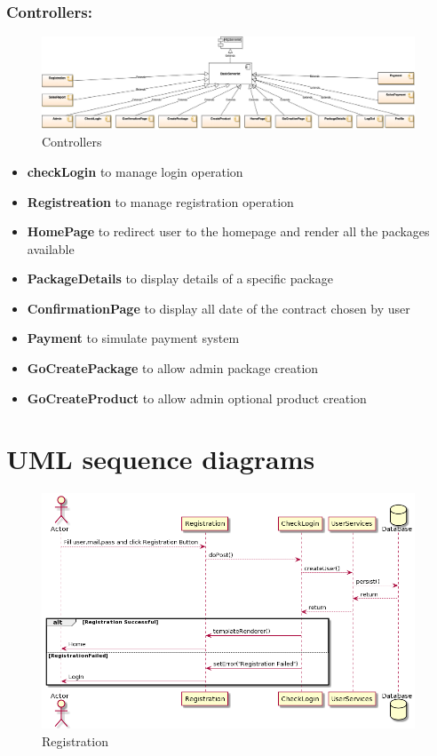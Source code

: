 \documentclass{article}
\begin{document}
\subsubsection{Controllers:}
\begin{figure}[hbt!]
\centering
\includegraphics[width=0.99\textwidth]{controllers.png}
\caption{Controllers}
\end{figure}
\begin{itemize}
	\item \textbf{checkLogin} to manage login operation
	\item \textbf{Registreation} to manage registration operation
	\item \textbf{HomePage} to redirect user to the homepage and render all the packages available
	\item \textbf{PackageDetails} to display details of a specific package
	\item \textbf{ConfirmationPage} to display all date of the contract chosen by user
	\item \textbf{Payment} to simulate payment system
	\item \textbf{GoCreatePackage} to allow admin package creation
	\item \textbf{GoCreateProduct} to allow admin optional product creation
\end{itemize}

\newpage
\section{UML sequence diagrams}

\begin{figure}[hbt!]
\centering
\includegraphics[width=0.99\textwidth]{Registration.png}
\caption{Registration}
\end{figure}
\end{document}

